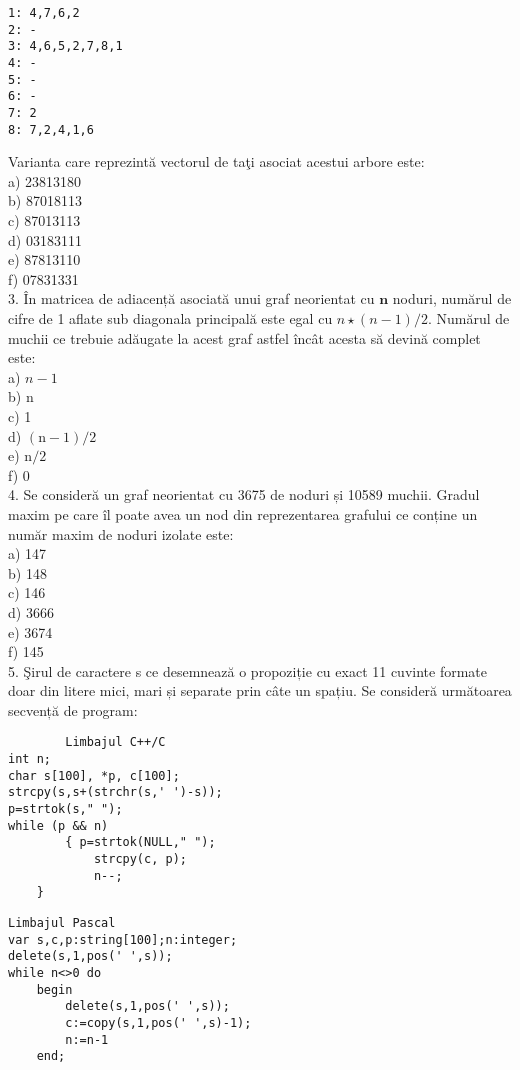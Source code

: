 \begin{verbatim}
1: 4,7,6,2
2: -
3: 4,6,5,2,7,8,1
4: -
5: -
6: -
7: 2
8: 7,2,4,1,6
\end{verbatim}

Varianta care reprezintă vectorul de taţi asociat acestui arbore este:\\
a) 23813180\\
b) 87018113\\
c) 87013113\\
d) 03183111\\
e) 87813110\\
f) 07831331\\
3. În matricea de adiacență asociată unui graf neorientat cu $\mathbf{n}$ noduri, numărul de cifre de 1 aflate sub diagonala principală este egal cu $n \star(n-1) / 2$. Numărul de muchii ce trebuie adăugate la acest graf astfel încât acesta să devină complet este:\\
a) $n-1$\\
b) n\\
c) 1\\
d) $(\mathrm{n}-1) / 2$\\
e) $\mathrm{n} / 2$\\
f) 0\\
4. Se consideră un graf neorientat cu 3675 de noduri și 10589 muchii. Gradul maxim pe care îl poate avea un nod din reprezentarea grafului ce conține un număr maxim de noduri izolate este:\\
a) 147\\
b) 148\\
c) 146\\
d) 3666\\
e) 3674\\
f) 145\\
5. Şirul de caractere s ce desemnează o propoziție cu exact 11 cuvinte formate doar din litere mici, mari și separate prin câte un spațiu. Se consideră următoarea secvență de program:

\begin{verbatim}
        Limbajul C++/C
int n;
char s[100], *p, c[100];
strcpy(s,s+(strchr(s,' ')-s));
p=strtok(s," ");
while (p && n)
        { p=strtok(NULL," ");
            strcpy(c, p);
            n--;
    }
\end{verbatim}

\begin{verbatim}
Limbajul Pascal
var s,c,p:string[100];n:integer;
delete(s,1,pos(' ',s));
while n<>0 do
    begin
        delete(s,1,pos(' ',s));
        c:=copy(s,1,pos(' ',s)-1);
        n:=n-1
    end;
\end{verbatim}

